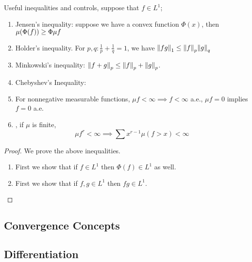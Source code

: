 \begin{thm}
    Useful inequalities and controls, suppose that \(f \in L^{1}\);
    \begin{enumerate}
        \item Jensen's inequality: suppose we have a convex function \(\Phi(x)\), then \(\mu\pqty{\Phi(f)} \geq \Phi \mu f\)
        \item Holder's inequality. For \(p,q: \frac{1}{p} + \frac{1}{q} = 1\), we have \(\norm{fg}_{1} \leq \norm{f}_{p} \norm{g}_{q}\)
        \item Minkowski's inequality: \(\norm{f + g}_{p} \leq \norm{f}_{p} + \norm{g}_{p}\).
        \item Chebyshev's Inequality: 
        \item For nonnegative measurable functions, \(\mu f < \infty  \implies f < \infty\) a.e., \(\mu f = 0\) implies \(f = 0\) a.e. 
        \item {}, if \(\mu\) is finite, 
        \begin{equation*}
            \mu f^{r} < \infty \implies \sum x^{r - 1} \mu(f> x) < \infty
        \end{equation*}
    \end{enumerate}    
\end{thm}

\begin{proof}
    We prove the above inequalities. 
    \begin{enumerate}
        \item First we show that if \(f \in L^{1}\) then \(\Phi(f) \in L^{1} \) as well. 
            
        \item First we show that if \(f, g  \in L^{1}\) then \(fg \in L^{1}\). 
    \end{enumerate}
\end{proof}


\begin{thm}

\end{thm}

\subsection{Convergence Concepts}


\begin{thm}
    
\end{thm}

\begin{thm}
    
\end{thm}

\subsection{Differentiation}
